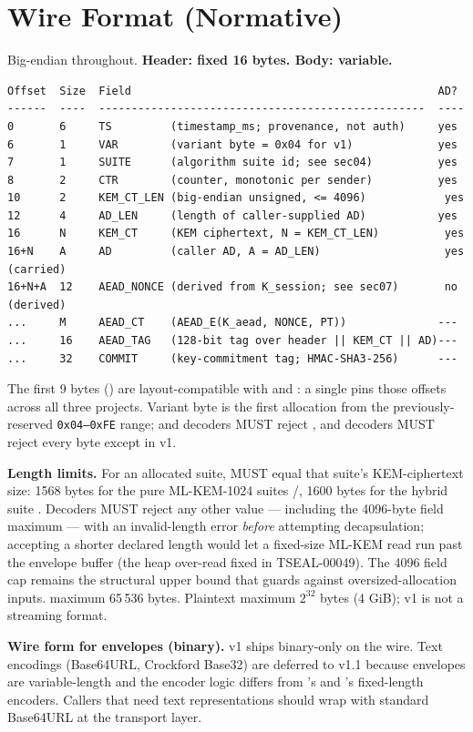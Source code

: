 \section{Wire Format (Normative)}
\label{sec:wire-format}

Big-endian throughout. \textbf{Header: fixed 16 bytes. Body: variable.}

\begin{lstlisting}[language=Pseudocode]
Offset  Size  Field                                               AD?
------  ----  --------------------------------------------------  ----
0       6     TS         (timestamp_ms; provenance, not auth)     yes
6       1     VAR        (variant byte = 0x04 for v1)             yes
7       1     SUITE      (algorithm suite id; see sec04)          yes
8       2     CTR        (counter, monotonic per sender)          yes
10      2     KEM_CT_LEN (big-endian unsigned, <= 4096)            yes
12      4     AD_LEN     (length of caller-supplied AD)           yes
16      N     KEM_CT     (KEM ciphertext, N = KEM_CT_LEN)          yes
16+N    A     AD         (caller AD, A = AD_LEN)                   yes (carried)
16+N+A  12    AEAD_NONCE (derived from K_session; see sec07)       no  (derived)
...     M     AEAD_CT    (AEAD_E(K_aead, NONCE, PT))              ---
...     16    AEAD_TAG   (128-bit tag over header || KEM_CT || AD)---
...     32    COMMIT     (key-commitment tag; HMAC-SHA3-256)      ---
\end{lstlisting}

The first 9 bytes () are layout-compatible with \pqid{} and \pqhash{}: a single  pins those offsets across all three projects. Variant byte  is the first allocation from the previously-reserved \texttt{0x04--0xFE} range; \pqid{} and \pqhash{} decoders MUST reject , and \pqcrypt{} decoders MUST reject every byte except  in v1.

\textbf{Length limits.} For an allocated suite,  MUST equal that suite's KEM-ciphertext size: 1568 bytes for the pure ML-KEM-1024 suites /, 1600 bytes for the hybrid suite . Decoders MUST reject any other value --- including the 4096-byte field maximum --- with an invalid-length error \emph{before} attempting decapsulation; accepting a shorter declared length would let a fixed-size ML-KEM read run past the envelope buffer (the heap over-read fixed in TSEAL-00049). The 4096 field cap remains the structural upper bound that guards against oversized-allocation inputs.  maximum 65\,536 bytes. Plaintext maximum $2^{32}$ bytes (4 GiB); v1 is not a streaming format.

\textbf{Wire form for envelopes (binary).} v1 ships binary-only on the wire. Text encodings (Base64URL, Crockford Base32) are deferred to v1.1 because envelopes are variable-length and the encoder logic differs from \pqid{}'s and \pqhash{}'s fixed-length encoders. Callers that need text representations should wrap with standard Base64URL at the transport layer.
